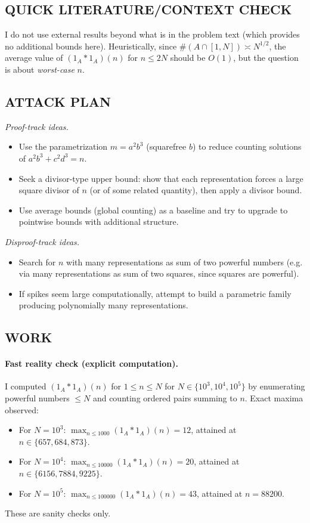 \subsection*{QUICK LITERATURE/CONTEXT CHECK}
I do not use external results beyond what is in the problem text (which provides no additional bounds here). Heuristically, since $\#(A\cap[1,N])\asymp N^{1/2}$, the average value of $(1_A*1_A)(n)$ for $n\le 2N$ should be $O(1)$, but the question is about \emph{worst-case} $n$.

\subsection*{ATTACK PLAN}
\emph{Proof-track ideas.}
\begin{itemize}
\item Use the parametrization $m=a^2b^3$ (squarefree $b$) to reduce counting solutions of $a^2b^3+c^2d^3=n$.
\item Seek a divisor-type upper bound: show that each representation forces a large square divisor of $n$ (or of some related quantity), then apply a divisor bound.
\item Use average bounds (global counting) as a baseline and try to upgrade to pointwise bounds with additional structure.
\end{itemize}
\emph{Disproof-track ideas.}
\begin{itemize}
\item Search for $n$ with many representations as sum of two powerful numbers (e.g. via many representations as sum of two squares, since squares are powerful).
\item If spikes seem large computationally, attempt to build a parametric family producing polynomially many representations.
\end{itemize}

\subsection*{WORK}
\paragraph{Fast reality check (explicit computation).}
I computed $(1_A*1_A)(n)$ for $1\le n\le N$ for $N\in\{10^3,10^4,10^5\}$ by enumerating powerful numbers $\le N$ and counting ordered pairs summing to $n$. Exact maxima observed:
\begin{itemize}
\item For $N=10^3$: $\max_{n\le 1000}(1_A*1_A)(n)=12$, attained at $n\in\{657,684,873\}$.
\item For $N=10^4$: $\max_{n\le 10000}(1_A*1_A)(n)=20$, attained at $n\in\{6156,7884,9225\}$.
\item For $N=10^5$: $\max_{n\le 100000}(1_A*1_A)(n)=43$, attained at $n=88200$.
\end{itemize}
These are sanity checks only.

